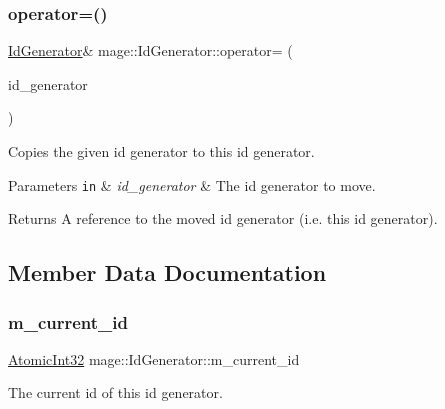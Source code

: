 \subsubsection{\texorpdfstring{operator=()}{operator=()}\hspace{0.1cm}{\footnotesize\ttfamily [2/2]}}
{\footnotesize\ttfamily \hyperlink{structmage_1_1_id_generator}{Id\+Generator}\& mage\+::\+Id\+Generator\+::operator= (\begin{DoxyParamCaption}\item[{\hyperlink{structmage_1_1_id_generator}{Id\+Generator} \&\&}]{id\+\_\+generator }\end{DoxyParamCaption})\hspace{0.3cm}{\ttfamily [delete]}}

Copies the given id generator to this id generator.


\begin{DoxyParams}[1]{Parameters}
\mbox{\tt in}  & {\em id\+\_\+generator} & The id generator to move. \\
\hline
\end{DoxyParams}
\begin{DoxyReturn}{Returns}
A reference to the moved id generator (i.\+e. this id generator). 
\end{DoxyReturn}


\subsection{Member Data Documentation}
\hypertarget{structmage_1_1_id_generator_ab094c8e57444d4fa02d5f3c2a5ea25f3}{}\label{structmage_1_1_id_generator_ab094c8e57444d4fa02d5f3c2a5ea25f3} 
\subsubsection{\texorpdfstring{m\+\_\+current\+\_\+id}{m\_current\_id}}
{\footnotesize\ttfamily \hyperlink{namespacemage_a37ac3b8da2d89495d105e00f1022cb1e}{Atomic\+Int32} mage\+::\+Id\+Generator\+::m\+\_\+current\+\_\+id\hspace{0.3cm}{\ttfamily [private]}}

The current id of this id generator. 
